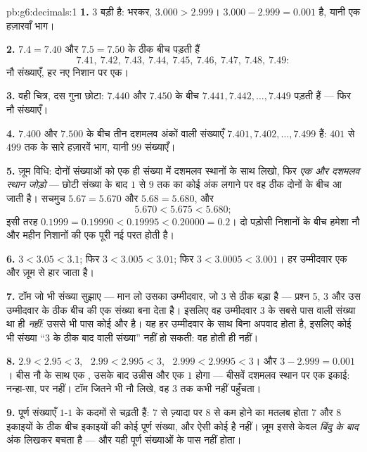\begin{solution}{pb:g6:decimals:1}
\textbf{1.} $3$ बड़ी है:  भरकर, $3.000 > 2.999$।
 $3.000 - 2.999 = 0.001$ है, यानी एक हज़ारवाँ भाग।

\textbf{2.} $7.4 = 7.40$ और $7.5 = 7.50$ के ठीक बीच पड़ती हैं
\[
7.41,\ 7.42,\ 7.43,\ 7.44,\ 7.45,\ 7.46,\ 7.47,\ 7.48,\ 7.49 :
\]
नौ संख्याएँ, हर नए निशान पर एक।

\textbf{3.} वही चित्र, दस गुना छोटा: $7.440$ और $7.450$ के बीच
$7.441, 7.442, \dots, 7.449$ पड़ती हैं --- फिर नौ
संख्याएँ।

\textbf{4.} $7.400$ और $7.500$ के बीच तीन दशमलव अंकों वाली
संख्याएँ $7.401, 7.402, \dots, 7.499$ हैं: $401$ से $499$ तक के
सारे हज़ारवें भाग, यानी $99$ संख्याएँ।

\textbf{5.} ज़ूम विधि: दोनों संख्याओं को एक ही संख्या में दशमलव
स्थानों के साथ लिखो, फिर \emph{एक और दशमलव स्थान जोड़ो} ---
छोटी संख्या के बाद $1$ से $9$ तक का कोई अंक लगाने पर वह ठीक
दोनों के बीच आ जाती है। सचमुच $5.67 = 5.670$ और
$5.68 = 5.680$, और
\[
5.670 < 5.675 < 5.680 ;
\]
इसी तरह $0.1999 = 0.19990 < 0.19995 < 0.20000 = 0.2$। दो पड़ोसी
निशानों के बीच हमेशा नौ और महीन निशानों की एक पूरी नई परत होती है।

\textbf{6.} $3 < 3.05 < 3.1$; फिर $3 < 3.005 < 3.01$; फिर
$3 < 3.0005 < 3.001$। हर उम्मीदवार एक और ज़ूम से हार जाता है।

\textbf{7.} टॉम जो भी संख्या सुझाए --- मान लो उसका उम्मीदवार,
जो $3$ से ठीक बड़ा है --- प्रश्न 5, $3$ और उस उम्मीदवार के ठीक
बीच की एक संख्या बना देता है। इसलिए वह उम्मीदवार $3$ के सबसे
पास वाली संख्या था ही \emph{नहीं}: उससे भी पास कोई और है। यह हर
उम्मीदवार के साथ बिना अपवाद होता है, इसलिए कोई भी संख्या ``$3$
के ठीक बाद वाली संख्या'' नहीं हो सकती: वह होती ही नहीं।

\textbf{8.} $2.9 < 2.95 < 3$, \ $2.99 < 2.995 < 3$, \
$2.999 < 2.9995 < 3$। और $3 - 2.999 = 0.001$। बीस नौ के साथ
 एक , उसके बाद उन्नीस  और एक $1$ होगा ---
बीसवें दशमलव स्थान पर एक इकाई: नन्हा-सा, पर \omterm{def:g1:counting:zero}{शून्य} नहीं। टॉम
जितने भी नौ लिखे, वह $3$ तक कभी नहीं पहुँचता।

\textbf{9.} पूर्ण संख्याएँ $1$-$1$ के कदमों से चढ़ती हैं: $7$
से ज़्यादा पर $8$ से कम होने का मतलब होता $7$ और $8$ इकाइयों के
ठीक बीच इकाइयों की कोई पूर्ण संख्या, और ऐसी कोई है नहीं। ज़ूम
इससे केवल \emph{बिंदु के बाद} अंक लिखकर बचता है --- और यही
पूर्ण संख्याओं के पास नहीं होता।


\end{solution}
